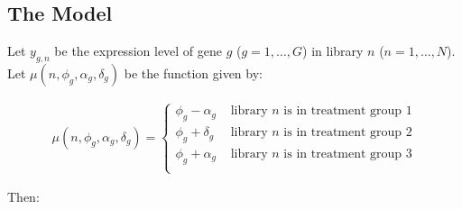 \documentclass{article}\usepackage{graphicx, color}
\begin{document}
\begin{flushleft}

\section{The Model} \label{sec:model}

Let $y_{g,n}$ be the expression level of gene $g$  ($g = 1, \ldots, G$) in library $n$ ($n = 1, \ldots, N$). Let $\mu(n, \phi_g, \alpha_g, \delta_g)$ be the function given by:


\begin{align*}
\mu(n, \phi_g, \alpha_g, \delta_g) = \begin{cases}
\phi_g - \alpha_g & \text{ library $n$ is in treatment group 1} \\
\phi_g + \delta_g & \text{ library $n$ is in treatment group 2} \\
\phi_g + \alpha_g & \text{ library $n$ is in treatment group 3} \\
\end{cases}
\end{align*}

Then:


\end{flushleft}
\end{document}
